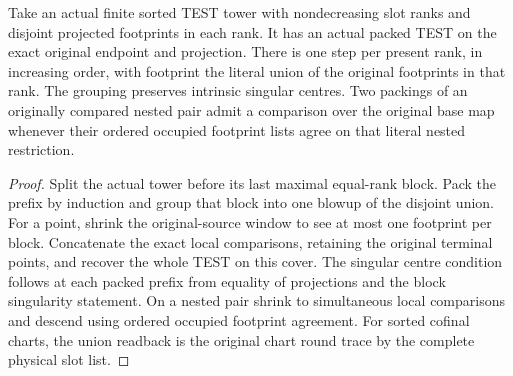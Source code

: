 \begin{theorem}
\label{hir:g8-exact-finite-rank-packing}
\leanok
Take an actual finite sorted TEST tower with nondecreasing slot ranks
and disjoint projected footprints in each rank. It has an actual
packed TEST on the exact original endpoint and projection. There
is one step per present rank, in increasing order, with footprint
the literal union of the original footprints in that rank. The
grouping preserves intrinsic singular centres. Two packings of
an originally compared nested pair admit a comparison over the
original base map whenever their ordered occupied footprint
lists agree on that literal nested restriction.
\end{theorem}
\begin{proof}
Split the actual tower before its last maximal equal-rank block.
Pack the prefix by induction and group that block into one blowup
of the disjoint union. For a point, shrink the original-source
window to see at most one footprint per block. Concatenate the
exact local comparisons, retaining the original terminal points,
and recover the whole TEST on this cover. The singular centre
condition follows at each packed prefix from equality of
projections and the block singularity statement. On a nested
pair shrink to simultaneous local comparisons and descend using
ordered occupied footprint agreement. For sorted cofinal charts,
the union readback is the original chart round trace by the
complete physical slot list.
\end{proof}

